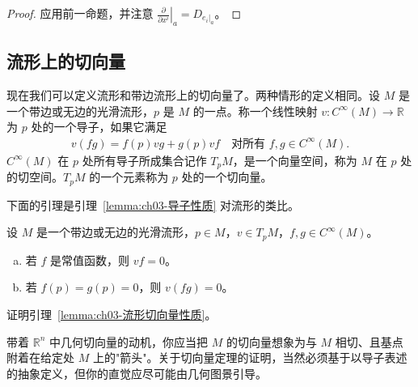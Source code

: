 \documentclass[../../main.tex]{subfiles}
\begin{document}
\begin{proof}
应用前一命题，并注意 $\left.\frac{\partial}{\partial x^{i}}\right|_{a}=D_{e_{i}|_{a}}$。
\end{proof}

\subsection{流形上的切向量}\label{subsection:ch03-流形上的切向量}

现在我们可以定义流形和带边流形上的切向量了。两种情形的定义相同。设 $M$ 是一个带边或无边的光滑流形，$p$ 是 $M$ 的一点。称一个线性映射 $v:C^{\infty}(M)\to\mathbb{R}$ 为 $p$ 处的一个导子，如果它满足
\begin{align}\label{align:ch03-流形导子}
v(fg)=f(p)vg+g(p)vf\quad\text{对所有 }f,g\in C^{\infty}(M).
\end{align}
$C^{\infty}(M)$ 在 $p$ 处所有导子所成集合记作 $T_{p}M$，是一个向量空间，称为 $M$ 在 $p$ 处的切空间。$T_{p}M$ 的一个元素称为 $p$ 处的一个切向量。

下面的引理是引理~\cref{lemma:ch03-导子性质} 对流形的类比。

\begin{lemma}[流形上切向量的性质]\label{lemma:ch03-流形切向量性质}
设 $M$ 是一个带边或无边的光滑流形，$p\in M$，$v\in T_{p}M$，$f,g\in C^{\infty}(M)$。
\begin{enumerate}[(a)]
\item 若 $f$ 是常值函数，则 $vf=0$。
\item 若 $f(p)=g(p)=0$，则 $v(fg)=0$。
\end{enumerate}
\end{lemma}

\begin{exercise}\label{exercise:ch03-3.5}
证明引理~\cref{lemma:ch03-流形切向量性质}。
\end{exercise}

带着 $\mathbb{R}^{n}$ 中几何切向量的动机，你应当把 $M$ 的切向量想象为与 $M$ 相切、且基点附着在给定处 $M$ 上的"箭头"。关于切向量定理的证明，当然必须基于以导子表述的抽象定义，但你的直觉应尽可能由几何图景引导。
\end{document}
